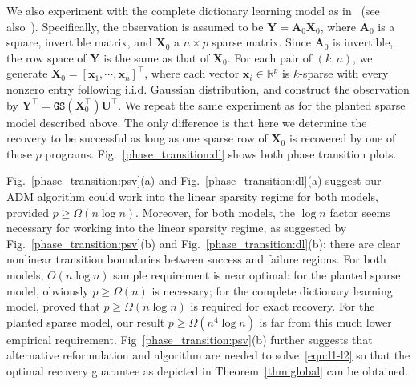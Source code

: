 \documentclass[11pt, journal, final]{IEEEtran}
\numberwithin{equation}{section}
\newcommand{\mb}{\mathbf}
\newcommand{\bb}{\mathbb}
\newcommand{ \brac }[1]{\left[ #1 \right]}
\newcommand{ \paren }[1]{ \left( #1 \right) }
\begin{document}
{We also experiment with the complete dictionary learning model as in~\cite{spielman2013exact} (see also~\cite{sun2015complete}). Specifically, the observation is assumed to be $\mb Y = \mb A_0 \mb X_0$, where $\mb A_0$ is a square, invertible matrix, and $\mb X_0$ a $n \times p$ sparse matrix. Since $\mb A_0$ is invertible, the row space of $\mb Y$ is the same as that of $\mb X_0$. For each pair of $(k,n)$, we generate ${\mb X}_0 = \brac{{\mb x}_1,\cdots,{\mb x}_n}^\top$, where each vector ${\mb x}_i\in \bb R^p$ is $k$-sparse with every nonzero entry following i.i.d. Gaussian distribution, and construct the observation by
$
{\mb Y}^\top = \mathtt{GS}\paren{{\mb X}_0^\top}{\mb U}^\top.
$
We repeat the same experiment as for the planted sparse model described above. The only difference is that here we determine the recovery to be successful as long as one sparse row of $\mb X_0$ is recovered by one of those $p$ programs. Fig.~\ref{phase_transition:dl} shows both phase transition plots.

Fig.~\ref{phase_transition:psv}(a) and Fig.~\ref{phase_transition:dl}(a) suggest our ADM algorithm could work into the linear sparsity regime for both models, provided $p \ge \Omega(n \log n)$. Moreover, for both models, the $\log  n$ factor seems necessary for working into the linear sparsity regime, as suggested by Fig.~\ref{phase_transition:psv}(b) and Fig.~\ref{phase_transition:dl}(b): there are clear nonlinear transition boundaries between success and failure regions. For both models, $O(n \log n)$ sample requirement is near optimal: for the planted sparse model, obviously $p \ge \Omega(n)$ is necessary; for the complete dictionary learning model, \cite{spielman2013exact} proved that $p\geq \Omega(n\log n)$ is required for exact recovery. For the planted sparse model, our result $p \ge \Omega(n^4 \log n)$ is far from this much lower empirical requirement. Fig~\ref{phase_transition:psv}(b) further suggests that alternative reformulation and algorithm are needed to solve~\eqref{eqn:l1-l2} so that the optimal recovery guarantee as depicted in Theorem~\ref{thm:global} can be obtained.

}
\end{document}
